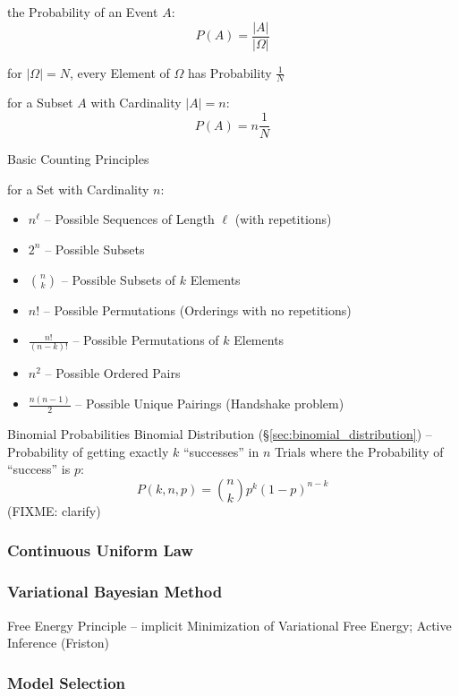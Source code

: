 the Probability of an Event $A$:
\[
  P(A) = \frac{|A|}{|\Omega|}
\]

for $|\Omega| = N$, every Element of $\Omega$ has Probability $\frac{1}{N}$

for a Subset $A$ with Cardinality $|A| = n$:
\[
  P(A) = n \frac{1}{N}
\]


Basic Counting Principles

for a Set with Cardinality $n$:
\begin{itemize}
  \item $n^\ell$ -- Possible Sequences of Length $\ell$ (with repetitions)
  \item $2^n$ -- Possible Subsets
  \item $\binom{n}{k}$ -- Possible Subsets of $k$ Elements
  \item $n!$ -- Possible Permutations (Orderings with no repetitions)
  \item $\frac{n!}{(n-k)!}$ -- Possible Permutations of $k$ Elements
  \item $n^2$ -- Possible Ordered Pairs
  \item $\frac{n(n-1)}{2}$ -- Possible Unique Pairings (Handshake problem)
\end{itemize}


Binomial Probabilities \fist Binomial Distribution
(\S\ref{sec:binomial_distribution}) -- Probability of getting exactly $k$
``successes'' in $n$ Trials where the Probability of ``success'' is $p$:
\[
  P(k,n,p) = \binom{n}{k}p^k(1-p)^{n-k}
\]
(FIXME: clarify)



\subsubsection{Continuous Uniform Law}\label{sec:continuous_uniform_law}

\subsubsection{Variational Bayesian Method}
\label{sec:variational_bayesian_method}

Free Energy Principle -- implicit Minimization of Variational Free Energy;
Active Inference (Friston)



\subsubsection{Model Selection}\label{sec:model_selection}

